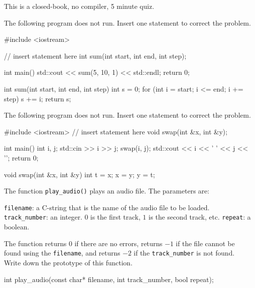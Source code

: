 

This is a closed-book, no compiler, 5 minute quiz.

\nextq
The following program does not run. Insert one statement to correct the problem.
\\
\ANSWER
\begin{answercode}
#include <iostream>

// insert statement here
int sum(int start, int end, int step);

int main()
{
    std::cout << sum(5, 10, 1) << std::endl;
    return 0;
}

int sum(int start, int end, int step)
{
    int s = 0;
    for (int i = start; i <= end; i += step)
    {
        s += i;
    }
    return s;
}
\end{answercode}

\nextq
The following program does not run. Insert one statement to correct the problem.
\\
\ANSWER
\begin{answercode}
#include <iostream>
// insert statement here
void swap(int &x, int &y);

int main()
{
    int i, j;
    std::cin >> i >> j;
    swap(i, j);
    std::cout << i << ' ' << j << '\n';
    return 0;
}

void swap(int &x, int &y)
{
    int t = x;
    x = y;
    y = t;
}
\end{answercode}

\nextq
The function \verb!play_audio()! plays an audio file. The parameters are:
\begin{enumerate}
\li \verb!filename!: a C-string that is the name of the audio file to be loaded.
\li \verb!track_number!: an integer.
$0$ is the first track, $1$ is the second track, etc.
\li \verb!repeat!: a boolean.
\end{enumerate}
The function returns $0$ if there are no errors,
returns $-1$ if the file cannot be found using the \verb!filename!,
and returns $-2$ if the \verb!track_number! is not found.
Write down the prototype of this function.
\\
\ANSWER
\begin{answercode}
int play_audio(const char* filename, int track_number, bool repeat);
\end{answercode}

